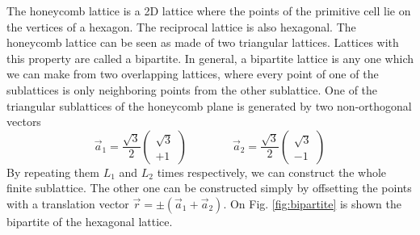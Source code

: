 The honeycomb lattice is a 2D lattice where the points of the primitive cell lie on the vertices of a hexagon. The reciprocal lattice is also hexagonal. The honeycomb lattice can be seen as made of two triangular lattices. Lattices with this property are called a bipartite. In general, a bipartite lattice is any one which we can make from two overlapping lattices, where every point of one of the sublattices is only neighboring points from the other sublattice. One of the triangular sublattices of the honeycomb plane is generated by two non-orthogonal vectors
\begin{equation}
  \vec{a}_1 = \frac{\sqrt{3}}{2}
  \begin{pmatrix}
    \sqrt{3} \\
    +1
  \end{pmatrix} \qquad \qquad
  \vec{a}_2 = \frac{\sqrt{3}}{2}
  \begin{pmatrix}
    \sqrt{3} \\
    -1
  \end{pmatrix}
\end{equation}
By repeating them $L_1$ and $L_2$ times respectively, we can construct the whole finite sublattice. The other one can be constructed simply by offsetting the points with a translation vector $\vec{r} = \pm(\vec{a}_1 + \vec{a}_2)$. On Fig. \ref{fig:bipartite} is shown the bipartite of the hexagonal lattice.
